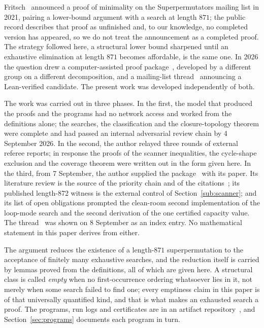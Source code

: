 \documentclass[10pt]{article}
\theoremstyle{remark}
\theoremstyle{plain}
\begin{document}
Fritsch~\cite{Fritsch21} announced a proof of minimality on the
Superpermutators mailing list in 2021, pairing a lower-bound argument
with a search at length $871$; the public record describes that proof
as unfinished and, to our knowledge, no completed version has
appeared, so we do not treat the announcement as a completed proof.  The strategy followed here, a structural lower bound
sharpened until an exhaustive elimination at length $871$ becomes
affordable, is the same one.  In 2026 the question drew a
computer-assisted proof package~\cite{A6872repo}, developed by a
different group on a different decomposition, and a mailing-list
thread~\cite{SPML26} announcing a Lean-verified candidate.  The present
work was developed independently of both.

The work was carried out in three phases.  In the first, the model that
produced the proofs and the programs had no network access and worked
from the definitions alone; the searches, the classification and the
closure-topology theorem were complete and had passed an internal
adversarial review chain by 4 September 2026.  In the second, the author
relayed three rounds of external referee reports; in response the
proofs of the scanner inequalities, the cycle-shape exclusion and the
coverage theorem were written out in the form given here.  In the third,
from 7 September, the author supplied the package~\cite{A6872repo} with
its paper.  Its literature review is the source of the priority chain
and of the citations~\cite{R26,HR26}; its published length-872 witness
is the external control of Section~\ref{sub:scanner}; and its list of
open obligations prompted the clean-room second implementation of the
loop-mode search and the second derivation of the one certified capacity
value.  The thread~\cite{SPML26} was shown on 8 September as an index
entry.  No mathematical statement in this paper derives from either.

The argument reduces the existence of a length-$871$ superpermutation
to the acceptance of finitely many exhaustive searches, and the
reduction itself is carried by lemmas proved from the definitions, all
of which are given here.  A
structural class is called \emph{empty} when no first-occurrence
ordering whatsoever lies in it, not merely when some search failed to
find one; every emptiness claim in this paper is of that universally
quantified kind, and that is what makes an exhausted search a proof.
The programs, run logs and certificates are in an artifact
repository~\cite{REPO}, and Section~\ref{sec:programs} documents each
program in turn.
\end{document}
